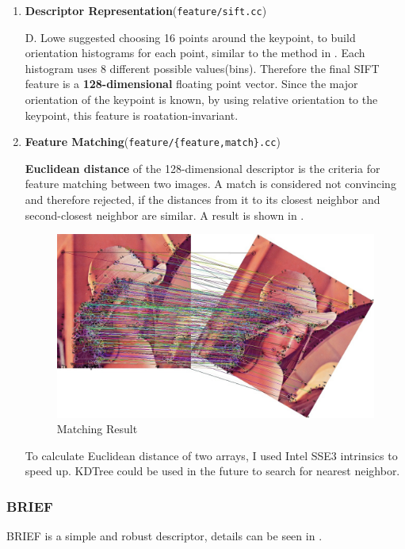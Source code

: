 \begin{enumerate}
  \item \textbf{Descriptor Representation}(\verb|feature/sift.cc|)

    D. Lowe suggested choosing 16 points around the keypoint, to build orientation histograms for each point, similar
    to the method in .
    Each histogram uses 8 different possible values(bins). Therefore the final SIFT feature is a \textbf{128-dimensional}
    floating point vector.
    Since the major orientation of the keypoint is known, by using relative orientation to the keypoint,
    this feature is roatation-invariant.

  \item \textbf{Feature Matching}(\verb|feature/{feature,match}.cc|)

    \textbf{Euclidean distance} of the 128-dimensional descriptor is the criteria for feature matching between two images.
    A match is considered not convincing and therefore rejected,
    if the distances from it to its closest neighbor and second-closest neighbor are similar.
    A result is shown in .
    \begin{figure}[H]
      \centering
      \includegraphics[width=\textwidth]{res/match.jpg}
      \caption{Matching Result\label{fig:match}}
    \end{figure}

    To calculate Euclidean distance of two arrays, I used Intel SSE3 intrinsics to speed up.
    KDTree could be used in the future to search for nearest neighbor.

\end{enumerate}

\subsubsection{BRIEF}
BRIEF is a simple and robust descriptor, details can be seen in \cite{brief}.

